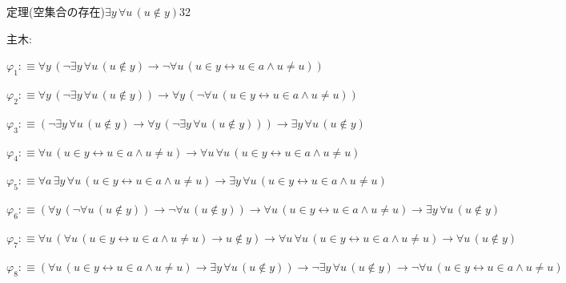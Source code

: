 \begin{fullproof}{定理(空集合の存在)}{$\exists y\,\forall u\,(u \notin y)$}{32}
\begin{ptree}
\noLine
{}
\noLine
{}
\end{ptree}
\noindent 主木:
\begin{ptree}
\noLine
{}
\end{ptree}
\begin{abbrevlist}
\item $\varphi_{1} :\equiv \forall y\,(\neg \exists y\,\forall u\,(u \notin y) \to \neg \forall u\,(u \in y \leftrightarrow u \in a \land u \neq u))$
\item $\varphi_{2} :\equiv \forall y\,(\neg \exists y\,\forall u\,(u \notin y)) \to \forall y\,(\neg \forall u\,(u \in y \leftrightarrow u \in a \land u \neq u))$
\item $\varphi_{3} :\equiv (\neg \exists y\,\forall u\,(u \notin y) \to \forall y\,(\neg \exists y\,\forall u\,(u \notin y))) \to \exists y\,\forall u\,(u \notin y)$
\item $\varphi_{4} :\equiv \forall u\,(u \in y \leftrightarrow u \in a \land u \neq u) \to \forall u\,\forall u\,(u \in y \leftrightarrow u \in a \land u \neq u)$
\item $\varphi_{5} :\equiv \forall a\,\exists y\,\forall u\,(u \in y \leftrightarrow u \in a \land u \neq u) \to \exists y\,\forall u\,(u \in y \leftrightarrow u \in a \land u \neq u)$
\item $\varphi_{6} :\equiv (\forall y\,(\neg \forall u\,(u \notin y)) \to \neg \forall u\,(u \notin y)) \to \forall u\,(u \in y \leftrightarrow u \in a \land u \neq u) \to \exists y\,\forall u\,(u \notin y)$
\item $\varphi_{7} :\equiv \forall u\,(\forall u\,(u \in y \leftrightarrow u \in a \land u \neq u) \to u \notin y) \to \forall u\,\forall u\,(u \in y \leftrightarrow u \in a \land u \neq u) \to \forall u\,(u \notin y)$
\item $\varphi_{8} :\equiv (\forall u\,(u \in y \leftrightarrow u \in a \land u \neq u) \to \exists y\,\forall u\,(u \notin y)) \to \neg \exists y\,\forall u\,(u \notin y) \to \neg \forall u\,(u \in y \leftrightarrow u \in a \land u \neq u)$

\end{abbrevlist}
\end{fullproof}
